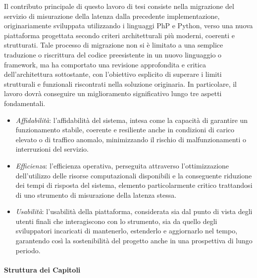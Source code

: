Il contributo principale di questo lavoro di tesi consiste nella migrazione del servizio di misurazione della latenza dalla precedente implementazione, originariamente sviluppata utilizzando i linguaggi PhP e Python, verso una nuova piattaforma progettata secondo criteri architetturali più moderni, coerenti e strutturati. Tale processo di migrazione non si è limitato a una semplice traduzione o riscrittura del codice preesistente in un nuovo linguaggio o framework, ma ha comportato una revisione approfondita e critica dell'architettura sottostante, con l'obiettivo esplicito di superare i limiti strutturali e funzionali riscontrati nella soluzione originaria.
In particolare, il lavoro dovrà conseguire un miglioramento significativo lungo tre aspetti fondamentali.
\begin{itemize}
    \item \emph{Affidabilità}: l'affidabilità del sistema, intesa come la capacità di garantire un funzionamento stabile, coerente e resiliente anche in condizioni di carico elevato o di traffico anomalo, minimizzando il rischio di malfunzionamenti o interruzioni del servizio.
    \item \emph{Efficienza}: l'efficienza operativa, perseguita attraverso l'ottimizzazione dell'utilizzo delle risorse computazionali disponibili e la conseguente riduzione dei tempi di risposta del sistema, elemento particolarmente critico trattandosi di uno strumento di misurazione della latenza stessa.
    \item \emph{Usabilità}: l'usabilità della piattaforma, considerata sia dal punto di vista degli utenti finali che interagiscono con lo strumento, sia da quello degli sviluppatori incaricati di mantenerlo, estenderlo e aggiornarlo nel tempo, garantendo così la sostenibilità del progetto anche in una prospettiva di lungo periodo.
\end{itemize}

\paragraph{Struttura dei Capitoli}

